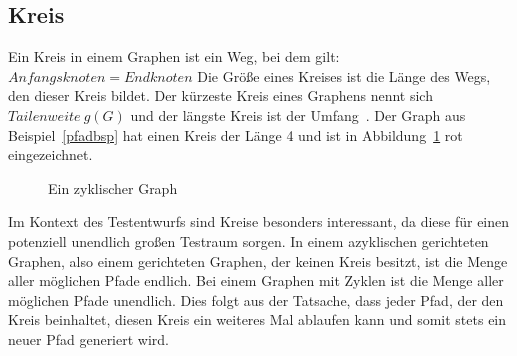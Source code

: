 \subsection{Kreis}

Ein Kreis in einem Graphen ist ein Weg, bei dem gilt: $Anfangsknoten = Endknoten$ \cite[vgl. S. 8]{graphentheorie}
Die Größe eines Kreises ist die Länge des Wegs, den dieser Kreis bildet.
Der kürzeste Kreis eines Graphens nennt sich $Tailenweite~g(G)$ und der längste Kreis ist der Umfang~\cite[vgl. S.8]{graphentheorie}.
Der Graph aus Beispiel~\ref{pfadbsp} hat einen Kreis der Länge 4 und ist in Abbildung~\ref{zyklgraph} rot eingezeichnet.

\begin{figure}[h!]
    \centering
    \caption{Ein zyklischer Graph}
    \label{zyklgraph}
\end{figure}

Im Kontext des Testentwurfs sind Kreise besonders interessant, da diese für einen potenziell unendlich großen Testraum sorgen.
In einem azyklischen gerichteten Graphen, also einem gerichteten Graphen, der keinen Kreis besitzt, ist die Menge aller möglichen Pfade endlich.
Bei einem Graphen mit Zyklen ist die Menge aller möglichen Pfade unendlich.
Dies folgt aus der Tatsache, dass jeder Pfad, der den Kreis beinhaltet, diesen Kreis ein weiteres Mal ablaufen kann und somit stets ein neuer Pfad generiert wird.

\newpage